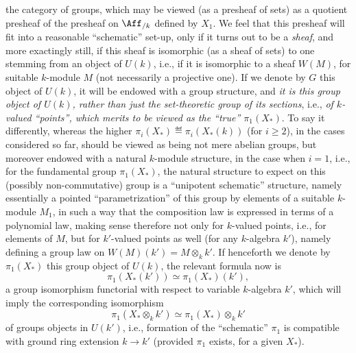 the category of groups, which may be viewed (as a presheaf of sets) as
a quotient presheaf of the presheaf on $\Aff_{/k}$ defined by
$X_1$. We feel that this presheaf will fit into a reasonable
``schematic'' set-up, only if it turns out to be a \emph{sheaf}, and
more exactingly still, if this sheaf is isomorphic (as a sheaf of
sets) to one stemming from an object of $U(k)$, i.e., if it is
isomorphic to a sheaf $W(M)$, for suitable $k$-module $M$ (not
necessarily a projective one). If we denote by $G$ this object of
$U(k)$, it will be endowed with a group structure, and \emph{it is
  this group object of $U(k)$, rather than just the set-theoretic
  group of its sections}, i.e., \emph{of $k$-valued ``points'', which
  merits to be viewed as the ``true'' $\pi_1(X_*)$}. To say it
differently, whereas the higher $\pi_i(X_*)\eqdef \pi_i(X_*(k))$ (for
$i\ge2$), in the cases considered so far, should be viewed as being
not mere abelian groups, but moreover endowed with a natural
$k$-module structure, in the case when $i=1$, i.e., for the
fundamental group $\pi_1(X_*)$, the natural structure to expect on
this (possibly non-commutative) group is a ``unipotent schematic''
structure, namely essentially a pointed ``parametrization'' of this
group by elements of a suitable $k$-module $M_1$, in such a way that
the composition law is expressed in terms of a polynomial law, making
sense therefore not only for $k$-valued points, i.e., for elements of
$M$, but for $k'$-valued points as well (for any $k$-algebra $k'$),
namely defining a group law on $W(M)(k') = M\otimes_k
k'$. If henceforth we denote by $\pi_1(X_*)$ this group object of
$U(k)$, the relevant formula now is
\begin{equation}
  \label{eq:113.G}
  \pi_1(X_*(k')) \simeq \pi_1(X_*)(k'),\tag{G}
\end{equation}
a group isomorphism functorial with respect to variable $k$-algebra
$k'$, which will imply the corresponding isomorphism
\begin{equation}
  \label{eq:113.Gprime}
  \pi_1(X_*\otimes_k k') \simeq \pi_1(X_*)\otimes_k k'\tag{G'}
\end{equation}
of groups objects in $U(k')$, i.e., formation of the ``schematic''
$\pi_1$ is compatible with ground ring extension $k\to k'$ (provided
$\pi_1$ exists, for a given $X_*$).

